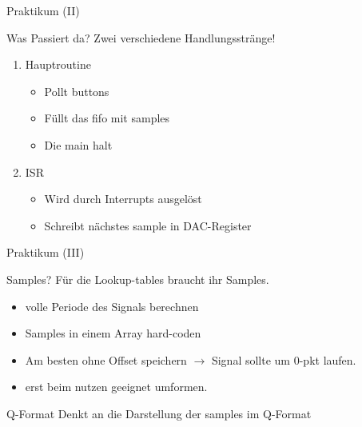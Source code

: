 
  \begin{frame} {Praktikum (II)}
    \begin{block} {Was Passiert da?}
      Zwei verschiedene Handlungsstränge!
      \begin{enumerate}
        \item Hauptroutine
              \begin{itemize}
                \item Pollt buttons
                \item Füllt das fifo mit samples
                \item Die main halt
              \end{itemize}
        \item ISR
              \begin{itemize}
                \item Wird durch Interrupts ausgelöst
                \item Schreibt nächstes sample in DAC-Register
              \end{itemize}
      \end{enumerate}
    \end{block}
  \end{frame}


  \begin{frame} {Praktikum (III)}
    \begin{block} {Samples?}
      Für die Lookup-tables braucht ihr Samples.
      \begin{itemize}
        \item volle Periode des Signals berechnen
        \item Samples in einem Array hard-coden
        \item Am besten ohne Offset speichern $\rightarrow$ Signal sollte um 0-pkt laufen.
        \item erst beim nutzen geeignet umformen.
      \end{itemize}
    \end{block}
    \begin{alertblock} {Q-Format}
      Denkt an die Darstellung der samples im Q-Format
    \end{alertblock}
  \end{frame}

